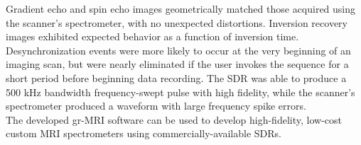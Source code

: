 \documentclass[10pt,letterpaper]{article}
\begin{document}
 Gradient echo 
and spin echo images geometrically matched those 
acquired using the scanner's spectrometer, with no unexpected distortions.
Inversion recovery images exhibited expected behavior as a function of inversion time.
Desynchronization events were more likely to occur at the very beginning of an imaging scan,
but were nearly eliminated if the user invokes the sequence for a short period before 
beginning data recording.
The SDR was able to produce a 500 kHz bandwidth frequency-swept pulse with high fidelity, 
while the scanner's spectrometer produced a waveform with large frequency spike errors. \\[1em]

 The developed gr-MRI software can be used to develop high-fidelity, 
low-cost custom MRI spectrometers 
using commercially-available SDRs. \\[1em]


%

\end{document}
